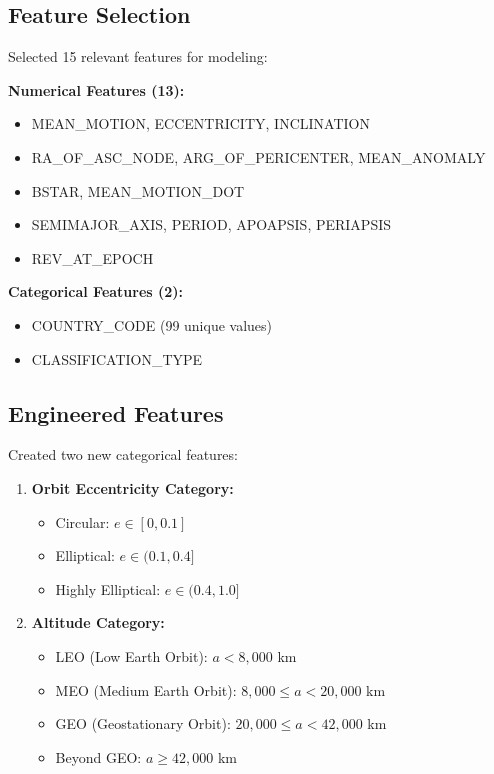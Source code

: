 \documentclass[12pt,a4paper]{article}
\begin{document}
\subsection{Feature Selection}
Selected 15 relevant features for modeling:

\textbf{Numerical Features (13):}
\begin{itemize}
    \item MEAN\_MOTION, ECCENTRICITY, INCLINATION
    \item RA\_OF\_ASC\_NODE, ARG\_OF\_PERICENTER, MEAN\_ANOMALY
    \item BSTAR, MEAN\_MOTION\_DOT
    \item SEMIMAJOR\_AXIS, PERIOD, APOAPSIS, PERIAPSIS
    \item REV\_AT\_EPOCH
\end{itemize}

\textbf{Categorical Features (2):}
\begin{itemize}
    \item COUNTRY\_CODE (99 unique values)
    \item CLASSIFICATION\_TYPE
\end{itemize}

\subsection{Engineered Features}
Created two new categorical features:

\begin{enumerate}
    \item \textbf{Orbit Eccentricity Category:}
    \begin{itemize}
        \item Circular: $e \in [0, 0.1]$
        \item Elliptical: $e \in (0.1, 0.4]$
        \item Highly Elliptical: $e \in (0.4, 1.0]$
    \end{itemize}
    
    \item \textbf{Altitude Category:}
    \begin{itemize}
        \item LEO (Low Earth Orbit): $a < 8,000$ km
        \item MEO (Medium Earth Orbit): $8,000 \leq a < 20,000$ km
        \item GEO (Geostationary Orbit): $20,000 \leq a < 42,000$ km
        \item Beyond GEO: $a \geq 42,000$ km
    \end{itemize}
\end{enumerate}
\end{document}
